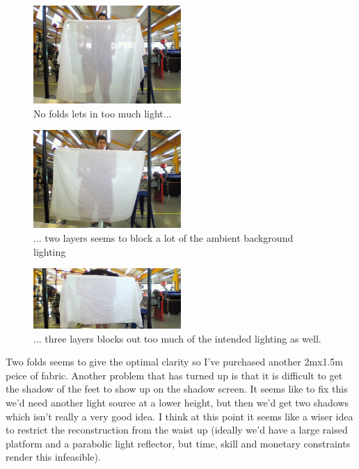 \documentclass[a4paper]{article}
\begin{document}
\begin{figure}[H]
  \centering
    \includegraphics[width=0.5\textwidth]{figures/one_fold.jpg}
    \caption{No folds lets in too much light...}
  \label{fig:f2}
\end{figure}
\begin{figure}[H]
  \centering
    \includegraphics[width=0.5\textwidth]{figures/two_folds.jpg}
    \caption{... two layers seems to block a lot of the ambient background lighting}
  \label{fig:f2}
\end{figure}
\begin{figure}[H]
  \centering
    \includegraphics[width=0.5\textwidth]{figures/three_folds.jpg}
    \caption{... three layers blocks out too much of the intended lighting as well.}
  \label{fig:f2}
\end{figure}

Two folds seems to give the optimal clarity so I've purchased another 2mx1.5m peice of fabric.
Another problem that has turned up is that it is difficult to get the shadow of the feet to show up on the shadow screen. 
It seems like to fix this we'd need another light source at a lower height, but then we'd get two shadows which isn't really a very good idea.
I think at this point it seems like a wiser idea to restrict the reconstruction from the waist up (ideally we'd have a large raised platform and a parabolic light reflector, but time, skill and monetary constraints render this infeasible).
\end{document}
